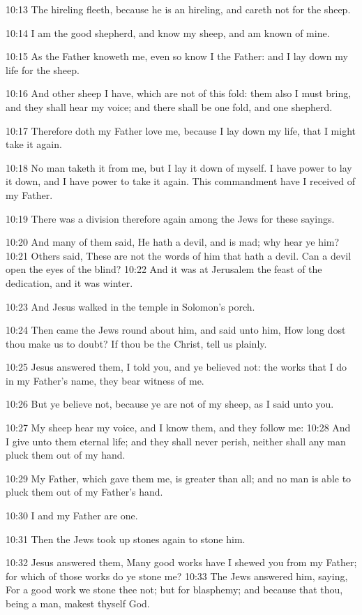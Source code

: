 10:13 The hireling fleeth, because he is an hireling, and careth not for the sheep.

10:14 I am the good shepherd, and know my sheep, and am known of mine.

10:15 As the Father knoweth me, even so know I the Father: and I lay down my life for the sheep.

10:16 And other sheep I have, which are not of this fold: them also I must bring, and they shall hear my voice; and there shall be one fold, and one shepherd.

10:17 Therefore doth my Father love me, because I lay down my life, that I might take it again.

10:18 No man taketh it from me, but I lay it down of myself. I have power to lay it down, and I have power to take it again. This commandment have I received of my Father.

10:19 There was a division therefore again among the Jews for these sayings.

10:20 And many of them said, He hath a devil, and is mad; why hear ye him?  10:21 Others said, These are not the words of him that hath a devil. Can a devil open the eyes of the blind?  10:22 And it was at Jerusalem the feast of the dedication, and it was winter.

10:23 And Jesus walked in the temple in Solomon's porch.

10:24 Then came the Jews round about him, and said unto him, How long dost thou make us to doubt? If thou be the Christ, tell us plainly.

10:25 Jesus answered them, I told you, and ye believed not: the works that I do in my Father's name, they bear witness of me.

10:26 But ye believe not, because ye are not of my sheep, as I said unto you.

10:27 My sheep hear my voice, and I know them, and they follow me: 10:28 And I give unto them eternal life; and they shall never perish, neither shall any man pluck them out of my hand.

10:29 My Father, which gave them me, is greater than all; and no man is able to pluck them out of my Father's hand.

10:30 I and my Father are one.

10:31 Then the Jews took up stones again to stone him.

10:32 Jesus answered them, Many good works have I shewed you from my Father; for which of those works do ye stone me?  10:33 The Jews answered him, saying, For a good work we stone thee not; but for blasphemy; and because that thou, being a man, makest thyself God.

